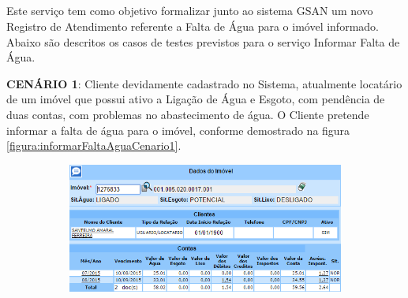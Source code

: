 \begin{flushleft}
\end{flushleft}


\subsection{\fontsize{12}{1} }
Este serviço tem como objetivo formalizar junto ao sistema GSAN um novo Registro de Atendimento referente a Falta de Água para o imóvel informado.
Abaixo são descritos os casos de testes previstos para o serviço Informar Falta de Água.
\begin{flushleft}
	\begin{description}
		\item \textbf{CENÁRIO 1}: Cliente devidamente cadastrado no Sistema, atualmente locatário de um imóvel que possui ativo a Ligação de Água e Esgoto, com pendência de duas contas, com problemas no abastecimento de água. O Cliente pretende informar a falta de água para o imóvel, conforme demostrado na figura \ref{figura:informarFaltaAguaCenario1}.
		\begin{figure}[H]
			\centering
			\caption{\textbf{Informar Falta de Água - Cenário de Teste 1}}
			\label{figura:informarFaltaAguaCenario1}
			\begin{subfigure}[H]{\textwidth}
				\centering
				\includegraphics{figuras/cenarios/informar_falta_agua/cenario_1.PNG}
			\end{subfigure}
		\end{figure}
	\end{description}
	

\end{flushleft}
